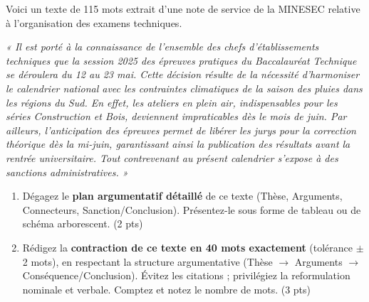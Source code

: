 \documentclass[11pt]{article}
\begin{document}
\begin{exercice}
Voici un texte de 115 mots extrait d'une note de service de la MINESEC relative à l'organisation des examens techniques.

\textit{ « Il est porté à la connaissance de l'ensemble des chefs d'établissements techniques que la session 2025 des épreuves pratiques du Baccalauréat Technique se déroulera du 12 au 23 mai. Cette décision résulte de la nécessité d'harmoniser le calendrier national avec les contraintes climatiques de la saison des pluies dans les régions du Sud. En effet, les ateliers en plein air, indispensables pour les séries Construction et Bois, deviennent impraticables dès le mois de juin. Par ailleurs, l'anticipation des épreuves permet de libérer les jurys pour la correction théorique dès la mi-juin, garantissant ainsi la publication des résultats avant la rentrée universitaire. Tout contrevenant au présent calendrier s'expose à des sanctions administratives. »}

\begin{enumerate}
    \item Dégagez le \textbf{plan argumentatif détaillé} de ce texte (Thèse, Arguments, Connecteurs, Sanction/Conclusion). Présentez-le sous forme de tableau ou de schéma arborescent. (2 pts)
    \item Rédigez la \textbf{contraction de ce texte en 40 mots exactement} (tolérance $\pm$ 2 mots), en respectant la structure argumentative (Thèse $\rightarrow$ Arguments $\rightarrow$ Conséquence/Conclusion). Évitez les citations ; privilégiez la reformulation nominale et verbale. Comptez et notez le nombre de mots. (3 pts)
\end{enumerate}
\end{exercice}
\end{document}
